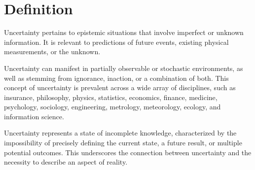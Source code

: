 \section{Definition}

\begin{definition}
    Uncertainty pertains to epistemic situations that involve imperfect or unknown information. 
    It is relevant to predictions of future events, existing physical measurements, or the unknown.
\end{definition}
Uncertainty can manifest in partially observable or stochastic environments, as well as stemming from ignorance, inaction, or a combination of both. 
This concept of uncertainty is prevalent across a wide array of disciplines, such as insurance, philosophy, physics, statistics, economics, finance, medicine, psychology, sociology, engineering, metrology, meteorology, ecology, and information science.

Uncertainty represents a state of incomplete knowledge, characterized by the impossibility of precisely defining the current state, a future result, or multiple potential outcomes. 
This underscores the connection between uncertainty and the necessity to describe an aspect of reality.